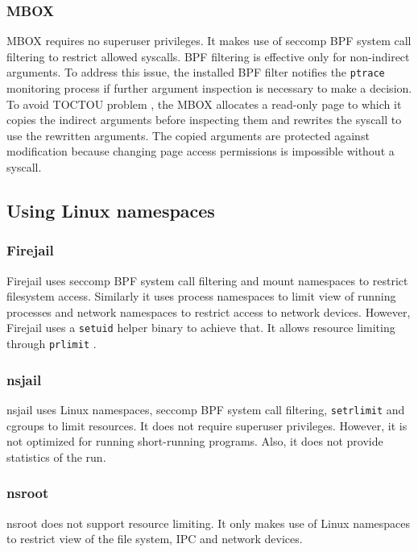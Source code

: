 \documentclass[en]{pracamgr}
\begin{document}
\subsubsection{MBOX}
MBOX \cite{kim2013practical} requires no superuser privileges. It makes use of seccomp BPF system call filtering to restrict allowed syscalls. BPF filtering is effective only for non-indirect arguments. To address this issue, the installed BPF filter notifies the \texttt{ptrace} monitoring process if further argument inspection is necessary to make a decision. To avoid TOCTOU problem \cite{cwe_toctou}, the MBOX allocates a read-only page to which it copies the indirect arguments before inspecting them and rewrites the syscall to use the rewritten arguments. The copied arguments are protected against modification because changing page access permissions is impossible without a syscall.

\subsection{Using Linux namespaces}

\subsubsection{Firejail}
Firejail \cite{netblue30/firejail} uses seccomp BPF system call filtering and mount namespaces to restrict filesystem access. Similarly it uses process namespaces to limit view of running processes and network namespaces to restrict access to network devices. However, Firejail uses a \texttt{setuid} \cite{man_setuid} helper binary to achieve that. It allows resource limiting through \texttt{prlimit} \cite{man_getrlimit_setrlimit_prlimit}.

\subsubsection{nsjail} \label{subsubsection:nsjail}
nsjail \cite{google/nsjail} uses Linux namespaces, seccomp BPF system call filtering, \texttt{setrlimit} \cite{man_getrlimit_setrlimit_prlimit} and cgroups to limit resources. It does not require superuser privileges. However, it is not optimized for running short-running programs. Also, it does not provide statistics of the run.

\subsubsection{nsroot}
nsroot \cite{raknes2016nsroot} does not support resource limiting. It only makes use of Linux namespaces to restrict view of the file system, IPC and network devices.
\end{document}
